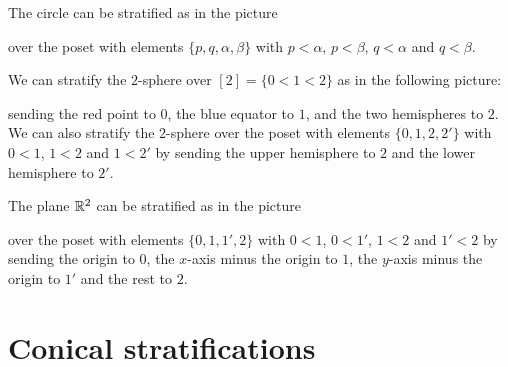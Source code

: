 \begin{exmp}
The circle can be stratified as in the picture
\begin{center}
\end{center}
over the poset with elements \(\{p,q,\alpha,\beta\}\) with \(p<\alpha\), \(p<\beta\), \(q<\alpha\) and \(q<\beta\).
\end{exmp}

\begin{exmp}
We can stratify the \(2\)-sphere over \([2]=\{0<1<2\}\) as in the following picture:
\begin{center}
\end{center}
sending the red point to \(0\), the blue equator to \(1\), and the two hemispheres to \(2\).
We can also stratify the \(2\)-sphere over the poset with elements \(\{0,1,2,2'\}\) with \(0<1\), \(1<2\) and \(1<2'\) by sending the upper hemisphere to \(2\) and the lower hemisphere to \(2'\).
\end{exmp}

\begin{exmp}
The plane \(\mathbb{R}^2\) can be stratified as in the picture
\begin{center}
\end{center}
over the poset with elements \(\{0,1,1',2\}\) with \(0<1\), \(0<1'\), \(1<2\) and \(1'<2\) by sending the origin to \(0\), the \(x\)-axis minus the origin to \(1\), the \(y\)-axis minus the origin to \(1'\) and the rest to \(2\).
\end{exmp}


\section{Conical stratifications}

